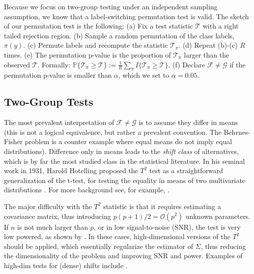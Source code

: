 \documentclass[]{bio}
\begin{document}
Because we focus on two-group testing under an independent sampling assumption, we know that a label-switching permutation test is valid. 
The sketch of our permutation test is the following: \newline
(a) Fix a test statistic $\mathcal{T}$ with a right tailed rejection region. \newline
(b) Sample a random permutation of the class labels, $\pi(y)$. \newline
(c) Permute labels and recompute the statistic $\mathcal{T}_\pi$. \newline
(d) Repeat (b)-(c) $R$ times. \newline
(e) The permutation p-value is the proportion of  $\mathcal{T}_\pi$ larger than the observed $\mathcal{T}$. Formally: 
$\mathbb{P}\{\mathcal{T}_\pi \geq \mathcal{T}\}:=\frac{1}{R} \sum_{\pi} I\{\mathcal{T}_\pi \geq \mathcal{T}\}$.\newline
(f) Declare $\mathcal{F}\neq \mathcal{G}$ if the permutation p-value is smaller than $\alpha$, which we set to $\alpha=0.05$.
\bigskip



\subsection{Two-Group Tests}
The most prevalent interpretation of $\mathcal{F}\neq \mathcal{G}$ is to assume they differ in means (this is not a logical equivalence, but rather a prevalent convention. The Behrnes-Fisher problem is a counter example where equal means do not imply equal distributions). 
Difference only in means leads to the \emph{shift class} of alternatives, which is by far the most studied class in the statistical literature. 
In his seminal work in 1931, Harold Hotelling proposed the $T^2$ test as a straightforward generalization of the t-test, for testing the equality in means of two multivariate distributions \citep{hotelling_generalization_1931}. 
For more background see, for example, \cite{anderson_introduction_2003}.

The major difficulty with the $T^2$ statistic is that it requires estimating a covariance matrix, thus introducing $p(p+1)/2=\mathcal{O}(p^2)$ unknown parameters.
If $n$ is not much larger than $p$, or in low signal-to-noise (SNR), the test is very low powered, as shown by \cite{bai1996effect}. 
In these cases, high-dimensional versions of the $T^2$ should be applied, which essentially regularize the estimator of $\Sigma$, thus reducing the dimensionality of the problem and improving SNR and power.
Examples of high-dim tests for (dense) shifts include 
\cite{dempster1958high,bai1996effect,schafer_shrinkage_2005,goeman2006testing,srivastava_test_2008,chen_two-sample_2010,lopes2011more,ahmad2014u,thulin2014high,feng2015note}.
\end{document}
